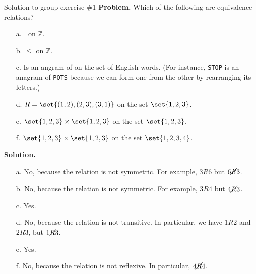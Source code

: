 \documentclass[10pt]{beamer}
\begin{document}
\begin{frame}{Solution to group exercise \#1}
\footnotesize 
\textbf{Problem.} Which of the following are equivalence relations?
	\begin{itemize} \footnotesize 
	\item[a.] $|$ on $\mathbb{Z}$.
	\item[b.] $\leq$ on $\mathbb{Z}$.
	\item[c.] Is-an-angram-of on the set of English words. (For instance, \texttt{STOP} is an anagram of \texttt{POTS} because we can form one from the other by rearranging its letters.)
	\item[d.] $R=\set{(1,2),(2,3),(3,1)}$ on the set $\set{1,2,3}$.
	\item[e.] $\set{1,2,3} \times \set{1,2,3}$ on the set $\set{1,2,3}$.
	\item[f.] $\set{1,2,3} \times \set{1,2,3}$ on the set $\set{1,2,3,4}$.
	\end{itemize}
	\vfill 
\textbf{Solution.}
	\begin{itemize} \footnotesize 
	\item[a.] No, because the relation is not symmetric.  For example, $3R6$ but $6\cancel{R}3$. 
	\item[b.] No, because the relation is not symmetric. For example, $3R4$ but $4\cancel{R}3$. 
	\item[c.] Yes. 
	\item[d.] No, because the relation is not transitive.  In particular, we have $1R2$ and $2R3$, but $1 \cancel{R} 3$.  %
	\item[e.] Yes. 
	\item[f.] No, because the relation is not reflexive. In particular, $4 \cancel{R} 4$. 
	\end{itemize}
	
\end{frame}
\end{document}
